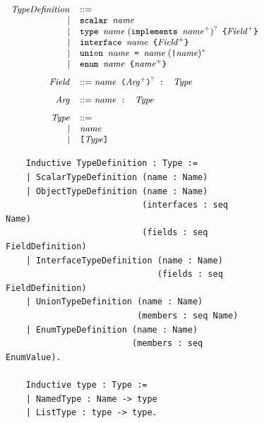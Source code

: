 %
\setlength{\grammarparsep}{10pt plus 1pt minus 1pt} %
\begin{figure}[h]
    \centering
    \begin{subfigure}{.5\textwidth}
    \begin{displaymath}
    \small
	\begin{array}{rl}
	\mathit{TypeDefinition} & ::= \\
	 | & \texttt{scalar } \mathit{name}  \\
	 | & \texttt{type } \mathit{name}\; (\texttt{implements } \mathit{name}^{+})^{?} \texttt{ \{} \mathit{Field}^{+} \texttt{\}}\\
	 | & \texttt{interface } \mathit{name} \texttt{ \{} \mathit{Field}^{+} \texttt{\}}\\
	 | & \texttt{union } \mathit{name} \texttt{ = } \mathit{name}\; (\texttt{|} \mathit{name})^{*}\\
	 | & \texttt{enum } \mathit{name} \texttt{ \{} \mathit{name}^{+} \texttt{\}} \\
	& \\[-1ex]
	\mathit{Field} & ::= \mathit{name} \texttt{ (} \mathit{Arg^{+}} \texttt{)}^{?} \texttt{ : } \mathit{Type}\\
	& \\[-1ex]
    \mathit{Arg} & ::= \mathit{name} \texttt{ : } \mathit{Type}\\
	& \\[-1ex]
    \mathit{Type} & ::=\\ 
     | & \mathit{name} \\
 	 | &  \texttt{[}  \mathit{Type} \texttt{]}
	\end{array}
	\end{displaymath}
	
    
    \end{subfigure}%
    \begin{subfigure}{.5\textwidth}
    \begin{verbatim}
    Inductive TypeDefinition : Type :=
    | ScalarTypeDefinition (name : Name)
    | ObjectTypeDefinition (name : Name)
                           (interfaces : seq Name)
                           (fields : seq FieldDefinition)
    | InterfaceTypeDefinition (name : Name)
                              (fields : seq FieldDefinition)
    | UnionTypeDefinition (name : Name)
                          (members : seq Name)
    | EnumTypeDefinition (name : Name)
                         (members : seq EnumValue).

    Inductive type : Type :=
    | NamedType : Name -> type
    | ListType : type -> type.
    \end{verbatim}


\end{subfigure}
\end{figure}
